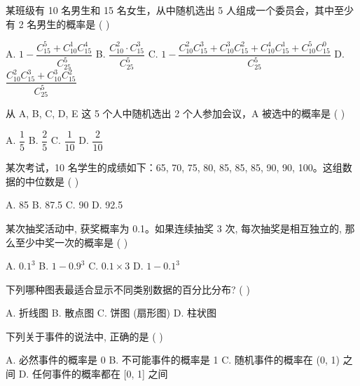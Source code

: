 \documentclass[11pt, a4paper]{article}
\begin{document}
\begin{baitap}[13]
某班级有 10 名男生和 15 名女生，从中随机选出 5 人组成一个委员会，其中至少有 2 名男生的概率是 ( )
\par\vspace{3pt}
\noindent A. $1 - \dfrac{C_{15}^5 + C_{10}^1 C_{15}^4}{C_{25}^5}$ \quad B. $\dfrac{C_{10}^2 \cdot C_{15}^3}{C_{25}^5}$ \quad C. $1 - \dfrac{C_{10}^2 C_{15}^3 + C_{10}^3 C_{15}^2 + C_{10}^4 C_{15}^1 + C_{10}^5 C_{15}^0}{C_{25}^5}$ \quad D. $\dfrac{C_{10}^2 C_{15}^3 + C_{10}^3 C_{15}^2}{C_{25}^5}$
\end{baitap}

\begin{baitap}[14]
从 A, B, C, D, E 这 5 个人中随机选出 2 个人参加会议，A 被选中的概率是 ( )
\par\vspace{3pt}
\noindent A. $\dfrac{1}{5}$ \quad B. $\dfrac{2}{5}$ \quad C. $\dfrac{1}{10}$ \quad D. $\dfrac{2}{10}$
\end{baitap}

\begin{baitap}[15]
某次考试，10 名学生的成绩如下：65, 70, 75, 80, 85, 85, 85, 90, 90, 100。这组数据的中位数是 ( )
\par\vspace{3pt}
\noindent A. 85 \quad B. 87.5 \quad C. 90 \quad D. 92.5
\end{baitap}

\begin{baitap}[16]
某次抽奖活动中, 获奖概率为 0.1。如果连续抽奖 3 次, 每次抽奖是相互独立的, 那么至少中奖一次的概率是 ( )
\par\vspace{3pt}
\noindent A. $0.1^3$ \quad B. $1 - 0.9^3$ \quad C. $0.1 \times 3$ \quad D. $1 - 0.1^3$
\end{baitap}

\begin{baitap}[17]
下列哪种图表最适合显示不同类别数据的百分比分布? ( )
\par\vspace{3pt}
\noindent A. 折线图 \quad B. 散点图 \quad C. 饼图 (扇形图) \quad D. 柱状图
\end{baitap}

\begin{baitap}[18]
下列关于事件的说法中, 正确的是 ( )
\par\vspace{3pt}
\noindent A. 必然事件的概率是 0 \quad B. 不可能事件的概率是 1 \quad C. 随机事件的概率在 (0, 1) 之间 \quad D. 任何事件的概率都在 [0, 1] 之间
\end{baitap}
\end{document}
